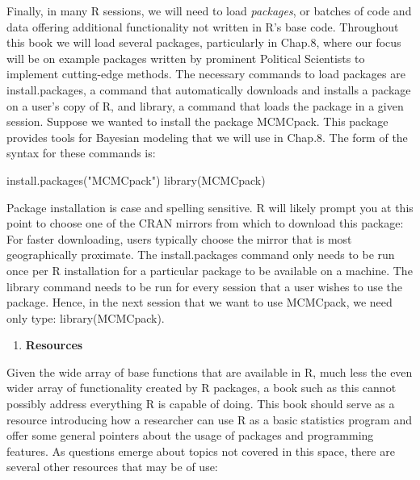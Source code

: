 \documentclass[
]{book}
\newenvironment{Shaded}{\begin{snugshade}}{\end{snugshade}}
\newcommand{\FunctionTok}[1]{\textcolor[rgb]{0.00,0.00,0.00}{#1}}
\newcommand{\NormalTok}[1]{#1}
\newcommand{\StringTok}[1]{\textcolor[rgb]{0.31,0.60,0.02}{#1}}
\providecommand{\tightlist}{%
  \setlength{\itemsep}{0pt}\setlength{\parskip}{0pt}}
\begin{document}
Finally, in many R sessions, we will need to load \emph{packages}, or batches of code and data offering additional functionality not written in R's base code. Throughout this book we will load several packages, particularly in Chap.8, where our focus will be on example packages written by prominent Political Scientists to implement cutting-edge methods. The necessary commands to load packages are install.packages, a command that automatically downloads and installs a package on a user's copy of R, and library, a command that loads the package in a given session. Suppose we wanted to install the package MCMCpack. This package provides tools for Bayesian modeling that we will use in Chap.8. The form of the syntax for these commands is:

\begin{Shaded}
\begin{Highlighting}[]
\FunctionTok{install.packages}\NormalTok{(}\StringTok{"MCMCpack"}\NormalTok{) }
\FunctionTok{library}\NormalTok{(MCMCpack)}
\end{Highlighting}
\end{Shaded}

Package installation is case and spelling sensitive. R will likely prompt you at this point to choose one of the CRAN mirrors from which to download this package: For faster downloading, users typically choose the mirror that is most geographically proximate. The install.packages command only needs to be run once per R installation for a particular package to be available on a machine. The library command needs to be run for every session that a user wishes to use the package. Hence, in the next session that we want to use MCMCpack, we need only type: library(MCMCpack).

\begin{enumerate}
\def\labelenumi{\arabic{enumi}.}
\setcounter{enumi}{4}
\tightlist
\item
  \textbf{Resources}
\end{enumerate}

Given the wide array of base functions that are available in R, much less the even wider array of functionality created by R packages, a book such as this cannot possibly address everything R is capable of doing. This book should serve as a resource introducing how a researcher can use R as a basic statistics program and offer some general pointers about the usage of packages and programming features. As questions emerge about topics not covered in this space, there are several other resources that may be of use:
\end{document}
